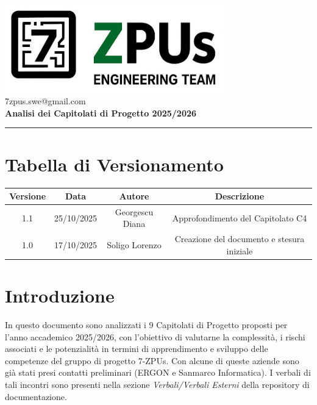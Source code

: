 \documentclass[a4paper,12pt]{article}
\begin{document}
\begin{center}
    \includegraphics[width=9.5cm]{../assets/logo7ZPUs.jpg}\\
    \small\hspace{10cm} 7zpus.swe@gmail.com\\
    \vspace{0.5cm}
    \Large \textbf{Analisi dei Capitolati di Progetto 2025/2026}\\
\end{center}

\vspace{0.3cm}
\hrule
\vspace{0.5cm}

\tableofcontents

\newpage

\section{Tabella di Versionamento}
\begin{tabular}{|c|c|c|c|}
    \hline
    \textbf{Versione} & \textbf{Data} & \textbf{Autore} & \textbf{Descrizione}                       \\
    \hline
     1.1 & 25/10/2025 & Georgescu Diana & Approfondimento del Capitolato C4 \\
    \hline
    1.0               & 17/10/2025    & Soligo Lorenzo  & Creazione del documento e stesura iniziale \\
    \hline

\end{tabular}

\section{Introduzione}
In questo documento sono analizzati i 9 Capitolati di Progetto proposti per
l'anno accademico 2025/2026, con l'obiettivo di valutarne la complessità, i
rischi associati e le potenzialità in termini di apprendimento e sviluppo delle
competenze del gruppo di progetto 7-ZPUs. Con alcune di queste aziende sono già
stati presi contatti preliminari (ERGON e Sanmarco Informatica). I verbali di
tali incontri sono presenti nella sezione \textit{Verbali/Verbali Esterni}
della repository di documentazione. \vspace{0.5cm}
\end{document}
